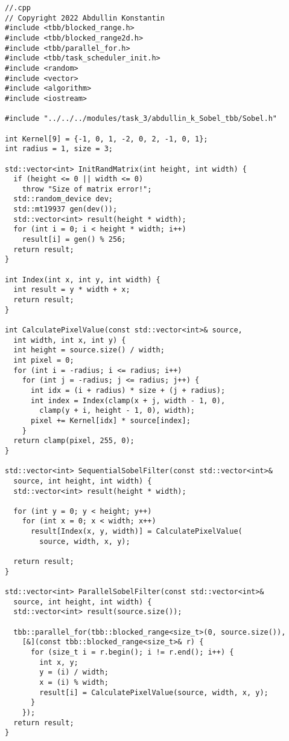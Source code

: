 \documentclass[12pt]{article}
\begin{document}
\begin{lstlisting}
//.cpp
// Copyright 2022 Abdullin Konstantin
#include <tbb/blocked_range.h>
#include <tbb/blocked_range2d.h>
#include <tbb/parallel_for.h>
#include <tbb/task_scheduler_init.h>
#include <random>
#include <vector>
#include <algorithm>
#include <iostream>

#include "../../../modules/task_3/abdullin_k_Sobel_tbb/Sobel.h"

int Kernel[9] = {-1, 0, 1, -2, 0, 2, -1, 0, 1};
int radius = 1, size = 3;

std::vector<int> InitRandMatrix(int height, int width) {
  if (height <= 0 || width <= 0)
    throw "Size of matrix error!";
  std::random_device dev;
  std::mt19937 gen(dev());
  std::vector<int> result(height * width);
  for (int i = 0; i < height * width; i++)
    result[i] = gen() % 256;
  return result;
}

int Index(int x, int y, int width) {
  int result = y * width + x;
  return result;
}

int CalculatePixelValue(const std::vector<int>& source,
  int width, int x, int y) {
  int height = source.size() / width;
  int pixel = 0;
  for (int i = -radius; i <= radius; i++)
    for (int j = -radius; j <= radius; j++) {
      int idx = (i + radius) * size + (j + radius);
      int index = Index(clamp(x + j, width - 1, 0),
        clamp(y + i, height - 1, 0), width);
      pixel += Kernel[idx] * source[index];
    }
  return clamp(pixel, 255, 0);
}

std::vector<int> SequentialSobelFilter(const std::vector<int>&
  source, int height, int width) {
  std::vector<int> result(height * width);

  for (int y = 0; y < height; y++)
    for (int x = 0; x < width; x++)
      result[Index(x, y, width)] = CalculatePixelValue(
        source, width, x, y);

  return result;
}

std::vector<int> ParallelSobelFilter(const std::vector<int>&
  source, int height, int width) {
  std::vector<int> result(source.size());

  tbb::parallel_for(tbb::blocked_range<size_t>(0, source.size()),
    [&](const tbb::blocked_range<size_t>& r) {
      for (size_t i = r.begin(); i != r.end(); i++) {
        int x, y;
        y = (i) / width;
        x = (i) % width;
        result[i] = CalculatePixelValue(source, width, x, y);
      }
    });
  return result;
}
\end{lstlisting}
\end{document}
